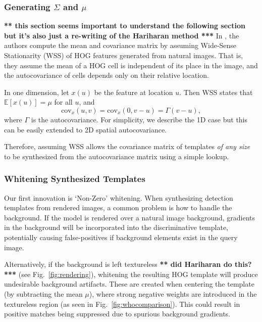 \documentclass[10pt,twocolumn,letterpaper]{article}
\newcommand{\scream}[1]{{\color{red} \bf *** #1 ***}}
\begin{document}
\subsubsection{Generating $\Sigma$ and $\mu$}
\scream{this section seems important to understand the following section but it's also just a re-writing of the Hariharan method}
In \cite{Hariharan12}, the authors compute the mean and covariance matrix by assuming Wide-Sense Stationarity (WSS) of HOG features
generated from natural images. That is, they assume the mean of a HOG cell is
independent of its place in the image, and the autocovariance of cells depends
only on their relative location.

In one dimension, let $x(u)$ be the feature at location $u$. Then WSS states
that $\mathbb{E}\left[x(u)\right] = \mu$ for all $u$, and
\begin{equation}
\textrm{cov}_x(u,v) = \textrm{cov}_x(0, v-u) = \Gamma(v-u),
\end{equation} where $\Gamma$ is the autocovariance. For simplicity, we describe the 1D case but this can be easily extended to 2D spatial autocovariance.

Therefore, assuming WSS allows the covariance matrix of templates \emph{of any size} to be synthesized from the autocovariance matrix using a simple lookup.

\subsubsection{Whitening Synthesized Templates}
Our first innovation is `Non-Zero' whitening. When synthesizing detection templates from rendered images, a common problem is how to handle the background. If the model is rendered over a natural image background, gradients in the background will be incorporated into the discriminative template, potentially causing false-positives if background elements exist in the query image.

Alternatively, if the background is left textureless \scream{did Hariharan do this?} (see Fig.~\ref{fig:rendering}), whitening the resulting HOG template will produce undesirable background artifacts. These are created when centering the template (by subtracting the mean $\mu$), where strong negative weights are introduced in the textureless region (as seen in Fig.~\ref{fig:whocomparison}). This could result in positive matches being suppressed due to spurious background gradients.
\end{document}
